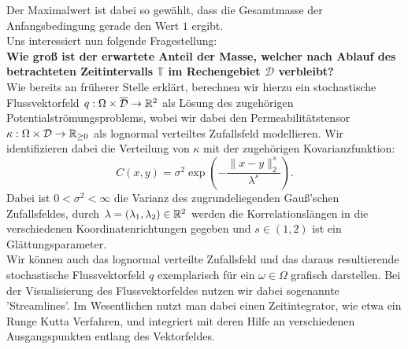 Der Maximalwert ist dabei so gewählt, dass die Gesamtmasse der Anfangsbedingung gerade den Wert $ 1 $ ergibt.\\
Uns interessiert nun folgende Fragestellung: \\
\textbf{Wie groß ist der erwartete Anteil der Masse, welcher nach Ablauf des betrachteten Zeitintervalls $ \mathbb{T} $ im Rechengebiet $ \mathcal{D} $ verbleibt?}\\

Wie bereits an früherer Stelle erklärt, berechnen wir hierzu ein stochastische Flussvektorfeld $ q : \Omega \times \overline{\mathcal{ D}} \to \mathbb{R}^2 $ als Lösung des zugehörigen Potentialströmungsproblems, wobei wir dabei den Permeabilitätstensor $ \kappa : \Omega \times \mathcal{D} \to \mathbb{R}_{\geq0} $ als lognormal verteiltes Zufallsfeld modellieren. Wir identifizieren dabei die Verteilung von $ \kappa $ mit der zugehörigen Kovarianzfunktion:
\[
 C(x,y) = \sigma^2 \exp(- \frac{\lVert x-y \rVert_2^s}{\lambda^s} ) .
\]
Dabei ist $ 0 < \sigma^2 < \infty $ die Varianz des zugrundeliegenden Gauß'schen Zufallsfeldes, durch $ \lambda = (\lambda_1,\lambda_2) \in \mathbb{R}^2 $ werden die Korrelationslängen in die verschiedenen Koordinatenrichtungen gegeben und $ s \in (1,2) $ ist ein Glättungsparameter. \\
Wir können auch das lognormal verteilte Zufallsfeld und das daraus resultierende stochastische Flussvektorfeld $ q $ exemplarisch für ein $ \omega \in \Omega $ grafisch darstellen. Bei der Visualisierung des Flussvektorfeldes nutzen wir dabei sogenannte 'Streamlines'. Im Wesentlichen nutzt man dabei einen Zeitintegrator, wie etwa ein Runge Kutta Verfahren, und integriert mit deren Hilfe an verschiedenen Ausgangspunkten entlang des Vektorfeldes.

\begin{figure}[H]
	\centering
	
\end{figure}

